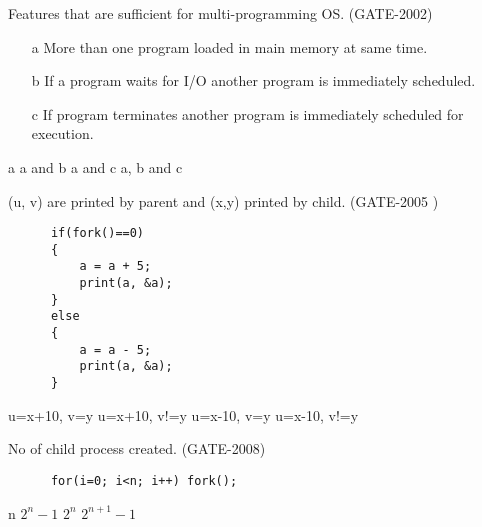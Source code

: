 
\begin{questyle}

  \question  Features that are sufficient for multi-programming OS. (GATE-2002)

   \begin{enumerate}
      \item[a] More than one program loaded in main memory at same time.
      \item[b] If a program waits for I/O another program is immediately scheduled.
      \item[c] If program terminates another program is immediately scheduled for execution.
   \end{enumerate}

  \begin{oneparchoices}
    \choice a
    \choice a and b
    \choice a and c
    \choice a, b and c
  \end{oneparchoices}

\end{questyle}




\begin{questyle}

  \question  (u, v) are printed by parent and (x,y) printed by child. (GATE-2005 )

    \begin{lstlisting}
      if(fork()==0)
      {
          a = a + 5;
          print(a, &a);
      }
      else
      {
          a = a - 5;
          print(a, &a);
      }
    \end{lstlisting}

  \begin{oneparchoices}
    \choice u=x+10, v=y
    \choice u=x+10, v!=y
    \choice u=x-10, v=y
    \choice u=x-10, v!=y
  \end{oneparchoices}

  \end{questyle}




\begin{questyle}

  \question  No of child process created. (GATE-2008)

  \begin{lstlisting}
      for(i=0; i<n; i++) fork();
  \end{lstlisting}

  \begin{oneparchoices}
    \choice n
    \choice \(2^n -1 \)
    \choice \(2^n \)
    \choice \(2^{n+1} -1 \)
  \end{oneparchoices}

\end{questyle}



